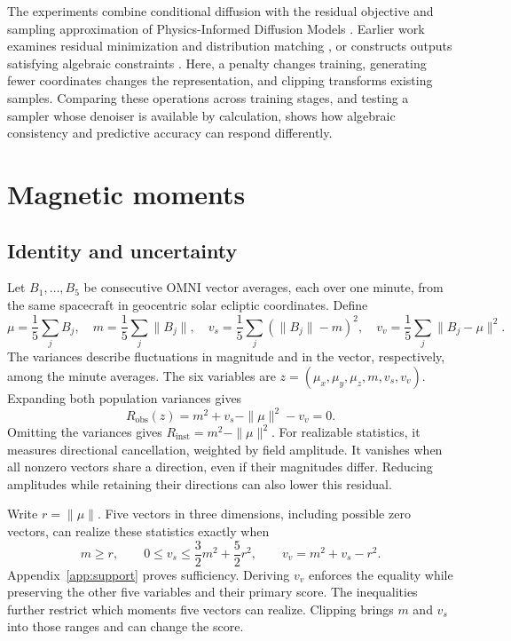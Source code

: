 \documentclass{article}
\begin{document}
The experiments combine conditional diffusion \citep{tashiro2021csdi} with the residual objective and sampling approximation of Physics-Informed Diffusion Models \citep{bastek2025pidm}. Earlier work examines residual minimization and distribution matching \citep{baldan2025physics}, or constructs outputs satisfying algebraic constraints \citep{beucler2021constraints}. Here, a penalty changes training, generating fewer coordinates changes the representation, and clipping transforms existing samples. Comparing these operations across training stages, and testing a sampler whose denoiser is available by calculation, shows how algebraic consistency and predictive accuracy can respond differently.



\section{Magnetic moments}

\subsection{Identity and uncertainty}

Let $B_1,\ldots,B_5$ be consecutive OMNI vector averages, each over one minute, from the same spacecraft in geocentric solar ecliptic coordinates. Define
\begin{equation}
 \mu=\frac15\sum_j B_j,\quad m=\frac15\sum_j\|B_j\|,\quad
 v_s=\frac15\sum_j(\|B_j\|-m)^2,\quad
 v_v=\frac15\sum_j\|B_j-\mu\|^2.
\end{equation}
The variances describe fluctuations in magnitude and in the vector, respectively, among the minute averages. The six variables are $z=(\mu_x,\mu_y,\mu_z,m,v_s,v_v)$. Expanding both population variances gives
\begin{equation}
 R_{\mathrm{obs}}(z)=m^2+v_s-\|\mu\|^2-v_v=0.
 \label{eq:identity}
\end{equation}
Omitting the variances gives $R_{\mathrm{inst}}=m^2-\|\mu\|^2$. For realizable statistics, it measures directional cancellation, weighted by field amplitude. It vanishes when all nonzero vectors share a direction, even if their magnitudes differ. Reducing amplitudes while retaining their directions can also lower this residual.

Write $r=\|\mu\|$. Five vectors in three dimensions, including possible zero vectors, can realize these statistics exactly when
\begin{equation}
 m\ge r,\qquad 0\le v_s\le\frac32m^2+\frac52r^2,\qquad
 v_v=m^2+v_s-r^2.
 \label{eq:support}
\end{equation}
Appendix~\ref{app:support} proves sufficiency. Deriving $v_v$ enforces the equality while preserving the other five variables and their primary score. The inequalities further restrict which moments five vectors can realize. Clipping brings $m$ and $v_s$ into those ranges and can change the score.
\end{document}
